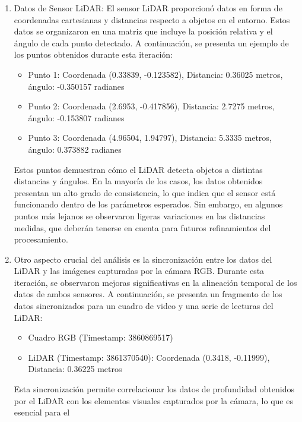     \begin{enumerate}
        \item Datos de Sensor LiDAR: El sensor LiDAR proporcion\'o datos en forma de coordenadas cartesianas 
            y distancias respecto a objetos en el entorno. Estos datos se organizaron en una matriz que incluye la 
            posici\'on relativa y el \'angulo de cada punto detectado. A continuaci\'on, se presenta un ejemplo de los 
            puntos obtenidos durante esta iteraci\'on:
            \begin{itemize}
                \item Punto 1: Coordenada (0.33839, -0.123582), Distancia: 0.36025 metros, \'angulo: -0.350157 radianes
                \item Punto 2: Coordenada (2.6953, -0.417856), Distancia: 2.7275 metros, \'angulo: -0.153807 radianes
                \item Punto 3: Coordenada (4.96504, 1.94797), Distancia: 5.3335 metros, \'angulo: 0.373882 radianes
            \end{itemize}
        Estos puntos demuestran c\'omo el LiDAR detecta objetos a distintas distancias y \'angulos. 
            En la mayor\'ia de los casos, los datos obtenidos presentan un alto grado de consistencia, 
            lo que indica que el sensor est\'a funcionando dentro de los par\'ametros esperados. Sin embargo, 
            en algunos puntos m\'as lejanos se observaron ligeras variaciones en las distancias medidas, que 
            deber\'an tenerse en cuenta para futuros refinamientos del procesamiento.
        \item Otro aspecto crucial del an\'alisis es la sincronizaci\'on entre los datos del LiDAR y 
            las im\'agenes capturadas por la c\'amara RGB. Durante esta iteraci\'on, se 
            observaron mejoras significativas en la alineaci\'on temporal de los datos de ambos sensores. 
            A continuaci\'on, se presenta un fragmento de los datos sincronizados para un cuadro de video 
            y una serie de lecturas del LiDAR:
            \begin{itemize}
                \item Cuadro RGB (Timestamp: 3860869517)
                \item LiDAR (Timestamp: 3861370540): Coordenada (0.3418, -0.11999), Distancia: 0.36225 metros
            \end{itemize}
        Esta sincronizaci\'on permite correlacionar los datos de profundidad obtenidos por el 
            LiDAR con los elementos visuales capturados por la c\'amara, lo que es esencial para el 

\end{enumerate}

